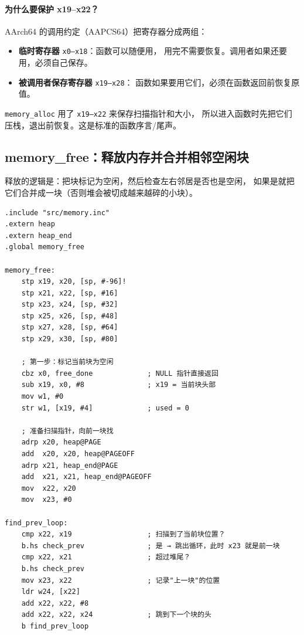 \paragraph{为什么要保护 x19--x22？}
AArch64 的调用约定（AAPCS64）把寄存器分成两组：
\begin{itemize}
    \item \textbf{临时寄存器} \texttt{x0--x18}：函数可以随便用，
        用完不需要恢复。调用者如果还要用，必须自己保存。
    \item \textbf{被调用者保存寄存器} \texttt{x19--x28}：
        函数如果要用它们，必须在函数返回前恢复原值。
\end{itemize}

\texttt{memory\_alloc} 用了 \texttt{x19--x22} 来保存扫描指针和大小，
所以进入函数时先把它们压栈，退出前恢复。这是标准的函数序言/尾声。

\subsection{memory\_free：释放内存并合并相邻空闲块}

释放的逻辑是：把块标记为空闲，然后检查左右邻居是否也是空闲，
如果是就把它们合并成一块（否则堆会被切成越来越碎的小块）。

\begin{lstlisting}[style=asm,caption=memoryfree.s — memory\_free]
.include "src/memory.inc"
.extern heap
.extern heap_end
.global memory_free

memory_free:
    stp x19, x20, [sp, #-96]!
    stp x21, x22, [sp, #16]
    stp x23, x24, [sp, #32]
    stp x25, x26, [sp, #48]
    stp x27, x28, [sp, #64]
    stp x29, x30, [sp, #80]

    ; 第一步：标记当前块为空闲
    cbz x0, free_done             ; NULL 指针直接返回
    sub x19, x0, #8               ; x19 = 当前块头部
    mov w1, #0
    str w1, [x19, #4]             ; used = 0

    ; 准备扫描指针，向前一块找
    adrp x20, heap@PAGE
    add  x20, x20, heap@PAGEOFF
    adrp x21, heap_end@PAGE
    add  x21, x21, heap_end@PAGEOFF
    mov  x22, x20
    mov  x23, #0

find_prev_loop:
    cmp x22, x19                  ; 扫描到了当前块位置？
    b.hs check_prev               ; 是 → 跳出循环，此时 x23 就是前一块
    cmp x22, x21                  ; 超过堆尾？
    b.hs check_prev
    mov x23, x22                  ; 记录"上一块"的位置
    ldr w24, [x22]
    add x22, x22, #8
    add x22, x22, x24             ; 跳到下一个块的头
    b find_prev_loop
\end{lstlisting}

